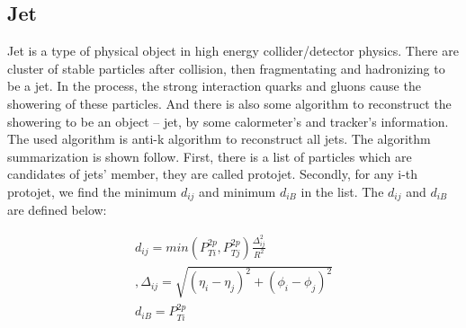 	\subsection{Jet}
	\label{ssec:PhysObj_jet}


		Jet is a type of physical object in high energy collider/detector physics. There are cluster of stable particles after collision, then fragmentating and hadronizing to be a jet. In the process, the strong interaction quarks and gluons cause the showering of these particles. And there is also some algorithm to reconstruct the showering to be an object -- jet, by some calormeter's and tracker's information.
		The used algorithm is anti-k algorithm to reconstruct all jets. The algorithm summarization is shown follow. First, there is a list of particles which are candidates of jets' member, they are called protojet. Secondly, for any i-th protojet, we find the minimum $d_{ij}$ and minimum $d_{iB}$ in the list. The $d_{ij}$ and $d_{iB}$ are defined below:

		\begin{equation}
		\begin{split}
		d_{ij} = min(P_{Ti}^{2p}, P_{Tj}^{2p}) \frac{\Delta_{ij}^2}{R^2}\\
		, \Delta_{ij} = \sqrt{ (\eta_i - \eta_j)^2 + (\phi_i - \phi_j)^2 }\\
		d_{iB} = P_{Ti}^{2p}
		\end{split}
		\label{eq:jet_reco_algo}
		\end{equation}
		\FloatBarrier

